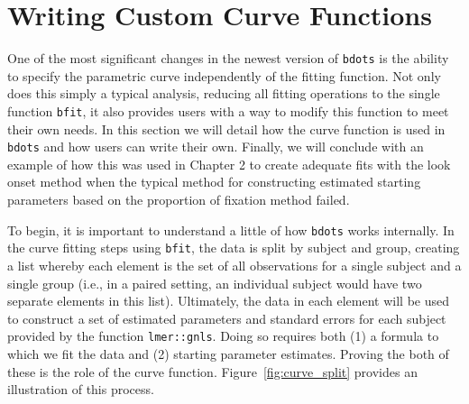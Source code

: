 \documentclass{article}
\newcommand{\xt}{\texttt}%
\begin{document}
\section{Writing Custom Curve Functions}

One of the most significant changes in the newest version of \xt{bdots} is the ability to specify the parametric curve independently of the fitting function. Not only does this simply a typical analysis, reducing all fitting operations to the single function \xt{bfit}, it also provides users with a way to modify this function to meet their own needs. In this section we will detail how the curve function is used in \xt{bdots} and how users can write their own. Finally, we will conclude with an example of how this was used in Chapter 2 to create adequate fits with the  look onset method when the typical method for constructing estimated starting parameters based on the proportion of fixation method failed.

To begin, it is important to understand a little of how \xt{bdots} works internally. In the curve fitting steps using \xt{bfit}, the data is split by subject and group, creating a list whereby each element is the set of all observations for a single subject and a single group (i.e., in a paired setting, an individual subject would have two separate elements in this list). Ultimately, the data in each element will be used to construct a set of estimated parameters and standard errors for each subject provided by the function \xt{lmer::gnls}. Doing so requires both (1) a formula to which  we fit the data and (2) starting parameter estimates. Proving the both of these is the role of the curve function. Figure~\ref{fig:curve_split} provides an illustration of this process.
\end{document}
